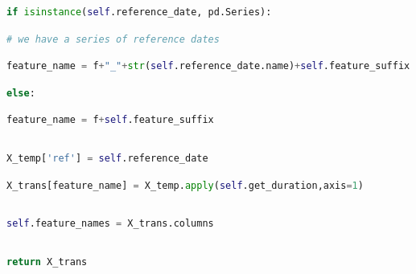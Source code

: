 \documentclass[
  11pt,
  a4paper,
  DIV=12,captions=tableheading,oneside]{scrbook}
\begin{document}
\begin{lstlisting}[language=Python,stepnumber=2,basicstyle=\footnotesize]
            if isinstance(self.reference_date, pd.Series):\end{lstlisting}
\begin{lstlisting}[language=Python,stepnumber=2,basicstyle=\footnotesize]
                # we have a series of reference dates\end{lstlisting}
\begin{lstlisting}[language=Python,stepnumber=2,basicstyle=\footnotesize]
                feature_name = f+"_"+str(self.reference_date.name)+self.feature_suffix\end{lstlisting}
\begin{lstlisting}[language=Python,stepnumber=2,basicstyle=\footnotesize]
            else:\end{lstlisting}
\begin{lstlisting}[language=Python,stepnumber=2,basicstyle=\footnotesize]
                feature_name = f+self.feature_suffix\end{lstlisting}
\begin{lstlisting}[language=Python,stepnumber=2,basicstyle=\footnotesize]
\end{lstlisting}
\begin{lstlisting}[language=Python,stepnumber=2,basicstyle=\footnotesize]
            X_temp['ref'] = self.reference_date\end{lstlisting}
\begin{lstlisting}[language=Python,stepnumber=2,basicstyle=\footnotesize]
            X_trans[feature_name] = X_temp.apply(self.get_duration,axis=1)\end{lstlisting}
\begin{lstlisting}[language=Python,stepnumber=2,basicstyle=\footnotesize]
\end{lstlisting}
\begin{lstlisting}[language=Python,stepnumber=2,basicstyle=\footnotesize]
        self.feature_names = X_trans.columns\end{lstlisting}
\begin{lstlisting}[language=Python,stepnumber=2,basicstyle=\footnotesize]
\end{lstlisting}
\begin{lstlisting}[language=Python,stepnumber=2,basicstyle=\footnotesize]
        return X_trans\end{lstlisting}
\begin{lstlisting}[language=Python,stepnumber=2,basicstyle=\footnotesize]
\end{lstlisting}
\end{document}
